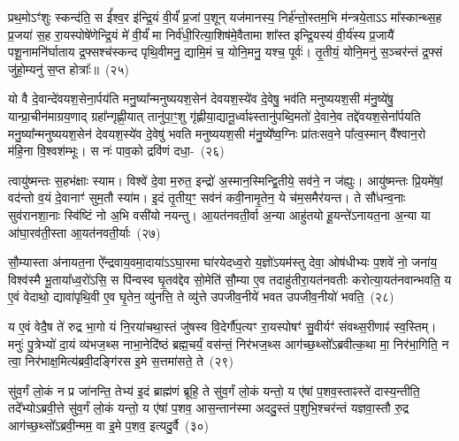 प्रथ॒मो\-ऽꣳ॑शुः स्कन्द॑ति॒ स ई᳚श्व॒र इ॑न्द्रि॒यं वी॒र्यं॑ प्र॒जां प॒शून् यज॑मानस्य॒ निर्\mbox{}ह॑न्तो॒स्तम॒भि म॑न्त्रये॒ता\-ऽऽ\- मा᳚स्कान्थ्स॒ह प्र॒जया॑ स॒ह रा॒यस्पोषे॑णेन्द्रि॒यं मे॑ वी॒र्यं॑ मा निर्व॑धी॒रित्या॒शिष॑मे॒वैतामा शा᳚स्त इन्द्रि॒यस्य॑ वी॒र्य॑स्य प्र॒जायै॑ पशू॒नामनि॑र्घाताय द्र॒फ्सश्च॑स्कन्द पृथि॒वीमनु॒ द्यामि॒मं च॒ योनि॒मनु॒ यश्च॒ पूर्वः॑। तृ॒तीयं॒ योनि॒मनु॑ स॒ञ्चर॑न्तं द्र॒फ्सं जु॑हो॒म्यनु॑ स॒प्त होत्राः᳚॥~(२५)

{\anuvakamend[{त॒र्पय॑त मा\-ऽभिषू॒यमा॑णस्य॒ यश्च॒ दश॑ च}]}%

यो वै दे॒वान्दे॑वयश॒सेना॒र्पय॑ति मनु॒ष्या᳚न्मनुष्ययश॒सेन॑ देव\-यश॒स्ये॑व दे॒वेषु॒ भव॑ति मनुष्ययश॒सी म॑नु॒ष्ये॑षु॒ यान्प्रा॒चीन॑\-माग्रय॒णाद् ग्रहा᳚न्गृह्णी॒यात् तानु॑पा॒ꣳ॒शु गृ॑ह्णीया॒द्यानू॒र्ध्वाꣴस्तानु॑पब्दि॒मतो॑ दे॒वाने॒व तद्दे॑वयश॒सेना᳚र्पयति मनु॒ष्या᳚न्मनुष्ययश॒सेन॑ देवयश॒स्ये॑व दे॒वेषु॑ भवति मनुष्ययश॒सी म॑नु॒ष्ये᳚ष्व॒ग्निः प्रा॑तःसव॒ने पा᳚त्व॒स्मान् वै᳚श्वान॒रो म॑हि॒ना वि॒श्वश॑म्भूः। स नः॑ पाव॒को द्रवि॑णं दधा॒-~(२६)

त्वायु॑ष्मन्तः स॒हभ॑क्षाः स्याम। विश्वे॑ दे॒वा म॒रुत॒ इन्द्रो॑ अ॒स्मान॒स्मिन्द्वि॒तीये॒ सव॑ने॒ न ज॑ह्युः। आयु॑ष्मन्तः प्रि॒यमे॑षां॒ वद॑न्तो व॒यं दे॒वानाꣳ॑ सुम॒तौ स्या॑म। इ॒दं तृ॒तीय॒ꣳ॒ सव॑नं कवी॒नामृ॒तेन॒ ये च॑म॒समैर॑यन्त। ते सौ॑धन्व॒नाः सुव॑रानशा॒नाः स्वि॑ष्टिं नो अ॒भि वसी॑यो नयन्तु। आ॒यत॑नवती॒र्वा अ॒न्या आहु॑तयो हू॒यन्ते॑\-ऽनायत॒ना अ॒न्या या आ॑घा॒रव॑ती॒स्ता आ॒यत॑नवती॒र्याः~(२७)

सौ॒म्यास्ता अ॑नायत॒ना ऐ᳚न्द्रवाय॒वमा॒दाया॑\-ऽऽ\-घा॒रमा घा॑रयेदध्व॒रो य॒ज्ञो॑\-ऽयम॑स्तु देवा॒ ओष॑धीभ्यः प॒शवे॑ नो॒ जना॑य॒ विश्व॑स्मै भू॒ताया᳚ध्व॒रो॑\-ऽसि॒ स पि॑न्वस्व घृ॒तव॑द्देव सो॒मेति॑ सौ॒म्या ए॒व तदाहु॑तीरा॒यत॑नवतीः करोत्या॒यत॑नवान्भवति॒ य ए॒वं वेदाथो॒ द्यावा॑\-पृथि॒वी ए॒व घृ॒तेन॒ व्यु॑नत्ति॒ ते व्यु॑त्ते उपजीव॒नीये॑ भवत उपजीव॒नीयो॑ भवति॒~(२८)

य ए॒वं वेदै॒ष ते॑ रुद्र भा॒गो यं नि॒रया॑चथा॒स्तं जु॑षस्व वि॒देर्गौ॑प॒त्यꣳ रा॒यस्पोषꣳ॑ सु॒वीर्यꣳ॑ संवथ्स॒रीणाꣴ॑ स्व॒स्तिम्। मनुः॑ पु॒त्रेभ्यो॑ दा॒यं व्य॑भज॒थ्स नाभा॒नेदि॑ष्ठं ब्रह्म॒चर्यं॒ वस॑न्तं॒ निर॑भज॒थ्स आग॑च्छ॒थ्सो᳚\-ऽब्रवीत्क॒था मा॒ निर॑भा॒गिति॒ न त्वा॒ निर॑भाक्ष॒मित्य॑ब्रवी॒दङ्गि॑रस इ॒मे स॒त्तमा॑सते॒ ते~(२९)

सु॑व॒र्गं लो॒कं न प्र जा॑नन्ति॒ तेभ्य॑ इ॒दं ब्राह्म॑णं ब्रूहि॒ ते सु॑व॒र्गं लो॒कं यन्तो॒ य ए॑षां प॒शव॒स्ताꣴस्ते॑ दास्य॒न्तीति॒ तदे᳚भ्यो\-ऽब्रवी॒त्ते सु॑व॒र्गं लो॒कं यन्तो॒ य ए॑षां प॒शव॒ आस॒न्तान॑स्मा अददु॒स्तं प॒शुभि॒श्चर॑न्तं यज्ञवा॒स्तौ रु॒द्र आग॑च्छ॒थ्सो᳚\-ऽब्रवी॒न्मम॒ वा इ॒मे प॒शव॒ इत्यदु॒र्वै~(३०)

